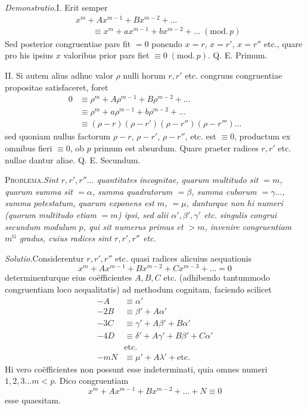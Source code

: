 \emph{Demonstratio.}\quad I. Erit semper
\[
\begin{aligned}
&x^m+Ax^{m-1}+Bx^{m-2}+\ldots\\
&\qquad\equiv x^m+ax^{m-1}+bx^{m-2}+\ldots\;(\mathrm{mod.}\,p)
\end{aligned}
\]
Sed posterior congruentiae pars fit $=0$ ponendo $x=r$, $x=r'$, $x=r''$ etc., quare pro his ipsius $x$ valoribus prior pars fiet $\equiv0\;(\mathrm{mod.}\,p)$. Q. E. Primum.

II. Si autem alius adhuc valor $\rho$ nulli horum $r,r'$ etc. congruus congruentiae propositae satisfaceret, foret
\[
\begin{aligned}
0&\equiv\rho^m+A\rho^{m-1}+B\rho^{m-2}+\ldots\\
&\equiv\rho^m+a\rho^{m-1}+b\rho^{m-2}+\ldots\\
&\equiv(\rho-r)(\rho-r')(\rho-r'')(\rho-r''')\ldots
\end{aligned}
\]
sed quoniam nullus factorum $\rho-r$, $\rho-r'$, $\rho-r''$, etc. est $\equiv0$, productum ex omnibus fieri $\equiv0$, ob $p$ primum est absurdum. Quare praeter radices $r,r'$ etc. nullae dantur aliae. Q. E. Secundum.

\textsc{Problema.}\quad\emph{Sint $r,r',r''\ldots$ quantitates incognitae, quarum multitudo sit $=m$, quarum summa sit $=\alpha$, summa quadratorum $=\beta$, summa cuborum $=\gamma\ldots$, summa potestatum, quarum exponens est $m$, $=\mu$, danturque non hi numeri (quorum multitudo etiam $=m$) ipsi, sed alii $\alpha',\beta',\gamma'$ etc. singulis congrui secundum modulum $p$, qui sit numerus primus et $>m$, invenire congruentiam $m^{\mathrm{ti}}$ gradus, cuius radices sint $r,r',r''$ etc.}

\emph{Solutio.}\quad Considerentur $r,r',r''$ etc. quasi radices alicuius aequationis
\[
x^m+Ax^{m-1}+Bx^{m-2}+Cx^{m-3}+\ldots=0
\]
determinenturque eius coëfficientes $A,B,C$ etc. (adhibendo tantummodo congruentiam loco aequalitatis) ad methodum cognitam, faciendo scilicet
%
\[
\begin{aligned}
-A&\equiv\alpha'\\
-2B&\equiv\beta'+A\alpha'\\
-3C&\equiv\gamma'+A\beta'+B\alpha'\\
-4D&\equiv\delta'+A\gamma'+B\beta'+C\alpha'\\
&\text{etc.}\\
-mN&\equiv\mu'+A\lambda'+\text{etc.}
\end{aligned}
\]
Hi vero coëfficientes non possunt esse indeterminati, quia omnes numeri $1,2,3\ldots m<p$. Dico congruentiam
\[
x^m+Ax^{m-1}+Bx^{m-2}+\ldots+N\equiv0
\]
esse quaesitam.

